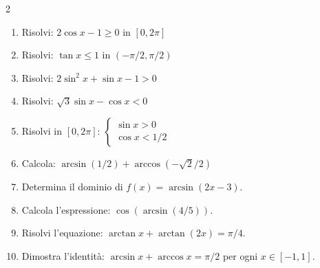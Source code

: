 \begin{multicols}{2}
\begin{enumerate}
    \item {} Risolvi: $2\cos x - 1 \ge 0$ in $[0, 2\pi]$
    \item {} Risolvi: $\tan x \le 1$ in $(-\pi/2, \pi/2)$
    \item {} Risolvi: $2\sin^2 x + \sin x - 1 > 0$
    \item {} Risolvi: $\sqrt{3}\sin x - \cos x < 0$
    \item {} Risolvi in $[0, 2\pi]$: $\begin{cases} \sin x > 0 \\ \cos x < 1/2 \end{cases}$
    \item {} Calcola: $\arcsin(1/2) + \arccos(-\sqrt{2}/2)$
    \item {} Determina il dominio di $f(x) = \arcsin(2x - 3)$.
    \item {} Calcola l'espressione: $\cos(\arcsin(4/5))$.
    \item {} Risolvi l'equazione: $\arctan x + \arctan(2x) = \pi/4$.
    \item {} Dimostra l'identità: $\arcsin x + \arccos x = \pi/2$ per ogni $x \in [-1, 1]$.
\end{enumerate}
\end{multicols}

